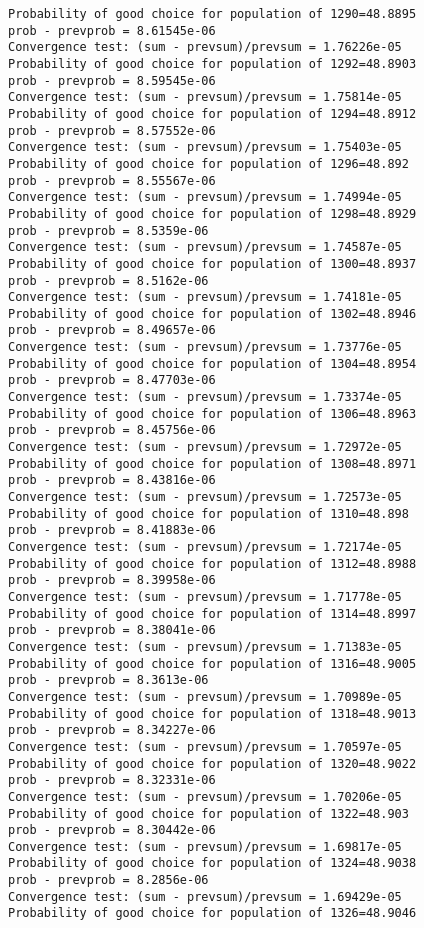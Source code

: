 \documentclass[11pt,onecolumn]{article}
\begin{document}
\begin{verbatim}
Probability of good choice for population of 1290=48.8895
prob - prevprob = 8.61545e-06
Convergence test: (sum - prevsum)/prevsum = 1.76226e-05
Probability of good choice for population of 1292=48.8903
prob - prevprob = 8.59545e-06
Convergence test: (sum - prevsum)/prevsum = 1.75814e-05
Probability of good choice for population of 1294=48.8912
prob - prevprob = 8.57552e-06
Convergence test: (sum - prevsum)/prevsum = 1.75403e-05
Probability of good choice for population of 1296=48.892
prob - prevprob = 8.55567e-06
Convergence test: (sum - prevsum)/prevsum = 1.74994e-05
Probability of good choice for population of 1298=48.8929
prob - prevprob = 8.5359e-06
Convergence test: (sum - prevsum)/prevsum = 1.74587e-05
Probability of good choice for population of 1300=48.8937
prob - prevprob = 8.5162e-06
Convergence test: (sum - prevsum)/prevsum = 1.74181e-05
Probability of good choice for population of 1302=48.8946
prob - prevprob = 8.49657e-06
Convergence test: (sum - prevsum)/prevsum = 1.73776e-05
Probability of good choice for population of 1304=48.8954
prob - prevprob = 8.47703e-06
Convergence test: (sum - prevsum)/prevsum = 1.73374e-05
Probability of good choice for population of 1306=48.8963
prob - prevprob = 8.45756e-06
Convergence test: (sum - prevsum)/prevsum = 1.72972e-05
Probability of good choice for population of 1308=48.8971
prob - prevprob = 8.43816e-06
Convergence test: (sum - prevsum)/prevsum = 1.72573e-05
Probability of good choice for population of 1310=48.898
prob - prevprob = 8.41883e-06
Convergence test: (sum - prevsum)/prevsum = 1.72174e-05
Probability of good choice for population of 1312=48.8988
prob - prevprob = 8.39958e-06
Convergence test: (sum - prevsum)/prevsum = 1.71778e-05
Probability of good choice for population of 1314=48.8997
prob - prevprob = 8.38041e-06
Convergence test: (sum - prevsum)/prevsum = 1.71383e-05
Probability of good choice for population of 1316=48.9005
prob - prevprob = 8.3613e-06
Convergence test: (sum - prevsum)/prevsum = 1.70989e-05
Probability of good choice for population of 1318=48.9013
prob - prevprob = 8.34227e-06
Convergence test: (sum - prevsum)/prevsum = 1.70597e-05
Probability of good choice for population of 1320=48.9022
prob - prevprob = 8.32331e-06
Convergence test: (sum - prevsum)/prevsum = 1.70206e-05
Probability of good choice for population of 1322=48.903
prob - prevprob = 8.30442e-06
Convergence test: (sum - prevsum)/prevsum = 1.69817e-05
Probability of good choice for population of 1324=48.9038
prob - prevprob = 8.2856e-06
Convergence test: (sum - prevsum)/prevsum = 1.69429e-05
Probability of good choice for population of 1326=48.9046

\end{verbatim}
\end{document}
